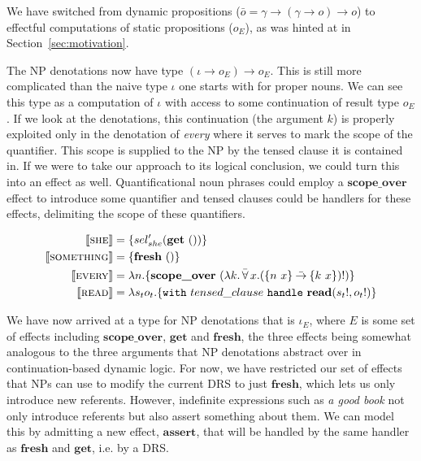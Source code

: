 \documentclass{article}
\newcommand{\dimpl}{\mathbin{\bar{\to}}}
\newcommand{\dforall}{\mathop{\bar{\forall}}}
\newcommand{\sem}[1]{\llbracket #1 \rrbracket}
\newcommand{\keyword}[1]{\texttt{#1}}
\newcommand{\effect}[1]{\textbf{#1}}
\newcommand{\semdom}[1]{\textbf{#1}}
\newcommand{\handle}[2]{\keyword{with}\ #1\ \keyword{handle}\ #2}
\begin{document}
We have switched from dynamic propositions ($\bar{o} = \gamma \to (\gamma \to
o) \to o$) to effectful computations of static propositions ($o_E$), as was
hinted at in Section~\ref{sec:motivation}.

The NP denotations now have type $(\iota \to o_E) \to o_E$. This is still more
complicated than the naive type $\iota$ one starts with for proper nouns. We
can see this type as a computation of $\iota$ with access to some continuation
of result type $o_E$. If we look at the denotations, this continuation (the
argument $k$) is properly exploited only in the denotation of \emph{every}
where it serves to mark the scope of the quantifier. This scope is supplied to
the NP by the tensed clause it is contained in. If we were to take our
approach to its logical conclusion, we could turn this into an effect as
well. Quantificational noun phrases could employ a $\effect{scope\_over}$
effect to introduce some quantifier and tensed clauses could be handlers for
these effects, delimiting the scope of these quantifiers.

\vspace{-4mm}

\begin{align*}
  \sem{\textsc{she}} &= \{ sel_{she}' (\effect{get}\ ()) \} \\
  \sem{\textsc{something}} &= \{ \effect{fresh}\ () \} \\
  \sem{\textsc{every}} &= \lambda n. \{ \effect{scope\_over}\ (\lambda
  k. \dforall x. (\{n\ x\} \dimpl \{k\ x\})!) \} \\
  \sem{\textsc{read}} &= \lambda s_t o_t. \{ \handle{tensed\_clause}{\semdom{read}(s_t!, o_t!)} \}
\end{align*}

We have now arrived at a type for NP denotations that is $\iota_E$, where $E$
is some set of effects including $\effect{scope\_over}$, $\effect{get}$ and
$\effect{fresh}$, the three effects being somewhat analogous to the three
arguments that NP denotations abstract over in continuation-based dynamic
logic. For now, we have restricted our set of effects that NPs can use to
modify the current DRS to just $\effect{fresh}$, which lets us only introduce
new referents. However, indefinite expressions such as \emph{a good book} not
only introduce referents but also assert something about them. We can model
this by admitting a new effect, $\effect{assert}$, that will be handled by the
same handler as $\effect{fresh}$ and $\effect{get}$, i.e. by a DRS.
\end{document}
